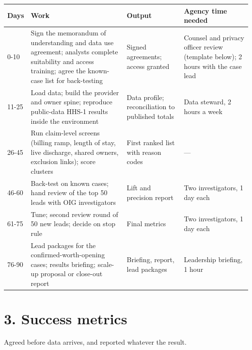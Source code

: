 \documentclass[letterpaper,11pt]{article}
\begin{document}
\begingroup\small\setlength{\tabcolsep}{4pt}\renewcommand{\arraystretch}{1.25}
\begin{longtable}[l]{@{}l>{\raggedright\arraybackslash}p{}>{\raggedright\arraybackslash}p{}>{\raggedright\arraybackslash}p{}@{}}
\rowcolor{coolblack}\leavevmode\color{white}\bfseries Days & \leavevmode\color{white}\bfseries Work & \leavevmode\color{white}\bfseries Output & \leavevmode\color{white}\bfseries Agency time needed \\
\endhead
0-10 & Sign the memorandum of understanding and data use agreement; analysts complete suitability and access training; agree the known-case list for back-testing & Signed agreements; access granted & Counsel and privacy officer review (template below); 2 hours with the case lead \\
11-25 & Load data; build the provider and owner spine; reproduce public-data HHS-1 results inside the environment & Data profile; reconciliation to published totals & Data steward, 2 hours a week \\
26-45 & Run claim-level screens (billing ramp, length of stay, live discharge, shared owners, exclusion links); score clusters & First ranked list with reason codes & --- \\
46-60 & Back-test on known cases; hand review of the top 50 leads with OIG investigators & Lift and precision report & Two investigators, 1 day each \\
61-75 & Tune; second review round of 50 new leads; decide on stop rule & Final metrics & Two investigators, 1 day each \\
76-90 & Lead packages for the confirmed-worth-opening cases; results briefing; scale-up proposal or close-out report & Briefing, report, lead packages & Leadership briefing, 1 hour \\
\end{longtable}\endgroup

\hypertarget{success-metrics}{%
\section*{3. Success metrics}\label{success-metrics}}

Agreed before data arrives, and reported whatever the result.
\end{document}
